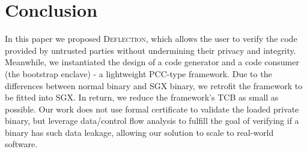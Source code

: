 \section{Conclusion}\label{sec-conclusion}

In this paper we proposed \textsc{Deflection}, which allows the user to verify the code provided by untrusted parties without undermining their privacy and integrity. Meanwhile, we instantiated the design of a code generator and a code consumer (the bootstrap enclave) - a lightweight PCC-type framework.
Due to the differences between normal binary and SGX binary, we retrofit the framework to be fitted into SGX. In return, we reduce the framework's TCB as small as possible.
Our work does not use formal certificate to validate the loaded private binary, but leverage data/control flow analysis to fulfill the goal of verifying if a binary has such data leakage, allowing our solution to scale to real-world software. 





